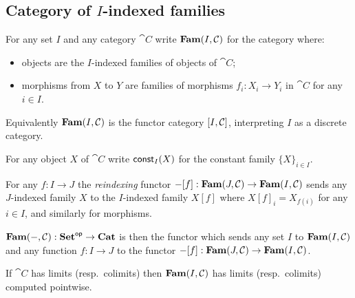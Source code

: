 \subsection{Category of $I$-indexed families}
\label{sec:fam}

\begin{definition}
For any set $I$ and any category $\cat{C}$ write $\mathbf{Fam}(I,\mathcal{C})$ for the category where:
\begin{itemize}
\item objects are the $I$-indexed families of objects of $\cat{C}$;
\item morphisms from $X$ to $Y$ are families of morphisms $f_i: X_i \to Y_i$ in $\cat{C}$ for any $i \in I$.
\end{itemize}
\end{definition}

\noindent Equivalently $\mathbf{Fam}(I,\mathcal{C})$ is the functor category $[I,\mathcal{C}]$, interpreting $I$ as a
discrete category.

\begin{definition}
For any object $X$ of $\cat{C}$ write $\mathsf{const}_I(X)$ for the constant family $\{X\}_{i \in I}$.
\end{definition}

\begin{definition}[Reindexing]
For any $f: I \to J$ the \emph{reindexing} functor $-[f]: \mathbf{Fam}(J,\mathcal{C}) \to \mathbf{Fam}(I,\mathcal{C})$ sends
any $J$-indexed family $X$ to the $I$-indexed family $X[f]$ where $X[f]_i = X_{f(i)}$ for any $i \in I$, and
similarly for morphisms.
\end{definition}

\begin{definition}
$\mathbf{Fam}(-,\mathcal{C}): \mathbf{Set}^{\mathsf{op}} \to \mathbf{Cat}$ is then the functor which sends any set $I$ to $\mathbf{Fam}(I,\mathcal{C})$ and
any function $f: I \to J$ to the functor $-[f]: \mathbf{Fam}(J,\mathcal{C}) \to \mathbf{Fam}(I,\mathcal{C})$.
\end{definition}

\begin{proposition}
If $\cat{C}$ has limits (resp.~colimits) then $\mathbf{Fam}(I,\mathcal{C})$ has limits (resp.~colimits) computed
pointwise.
\end{proposition}
